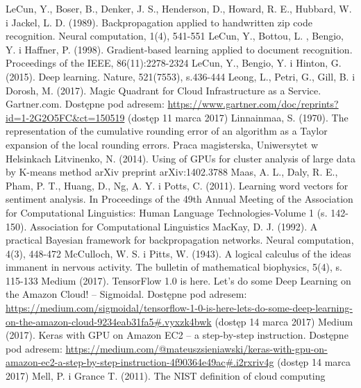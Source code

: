 \documentclass[12pt,a4paper,twoside]{article}
\begin{document}
\begin{thebibliography}{99}
 LeCun, Y., Boser, B., Denker, J. S., Henderson, D., Howard, R. E., Hubbard, W. i Jackel, L. D. (1989). Backpropagation applied to handwritten zip code recognition. Neural computation, 1(4), 541-551
 LeCun, Y., Bottou, L. , Bengio, Y. i Haffner, P. (1998). Gradient-based learning applied to document recognition. Proceedings of the IEEE, 86(11):2278-2324
 LeCun, Y., Bengio, Y. i Hinton, G. (2015). Deep learning. Nature, 521(7553), s.436-444
 Leong, L., Petri, G., Gill, B. i Dorosh, M. (2017). Magic Quadrant for Cloud Infrastructure as a Service. Gartner.com. Dostępne pod adresem: \url{https://www.gartner.com/doc/reprints?id=1-2G2O5FC&ct=150519} (dostęp 11 marca 2017)
 Linnainmaa, S. (1970). The representation of the cumulative rounding error of an algorithm as a
Taylor expansion of the local rounding errors. Praca magisterska, Uniwersytet w Helsinkach
 Litvinenko, N. (2014). Using of GPUs for cluster analysis of large data by K-means method arXiv preprint arXiv:1402.3788
 Maas, A. L., Daly, R. E., Pham, P. T., Huang, D., Ng, A. Y. i Potts, C. (2011). Learning word vectors for sentiment analysis. In Proceedings of the 49th Annual Meeting of the Association for Computational Linguistics: Human Language Technologies-Volume 1 (s. 142-150). Association for Computational Linguistics
 MacKay, D. J. (1992). A practical Bayesian framework for backpropagation networks. Neural computation, 4(3), 448-472
 McCulloch, W. S. i Pitts, W. (1943). A logical calculus of the ideas immanent in nervous activity. The bulletin of mathematical biophysics, 5(4), s. 115-133
 Medium (2017). TensorFlow 1.0 is here. Let’s do some Deep Learning on the Amazon Cloud! – Sigmoidal. Dostępne pod adresem: \url{https://medium.com/sigmoidal/tensorflow-1-0-is-here-lets-do-some-deep-learning-on-the-amazon-cloud-9234eab31fa5#.vyxzk4bwk} (dostęp 14 marca 2017)
 Medium (2017). Keras with GPU on Amazon EC2 – a step-by-step instruction. Dostępne pod adresem: \url{https://medium.com/@mateuszsieniawski/keras-with-gpu-on-amazon-ec2-a-step-by-step-instruction-4f90364e49ac#.i2rxriv4g} (dostęp 14 marca 2017)
 Mell, P. i Grance T. (2011). The NIST definition of cloud computing

\end{thebibliography}
\end{document}
